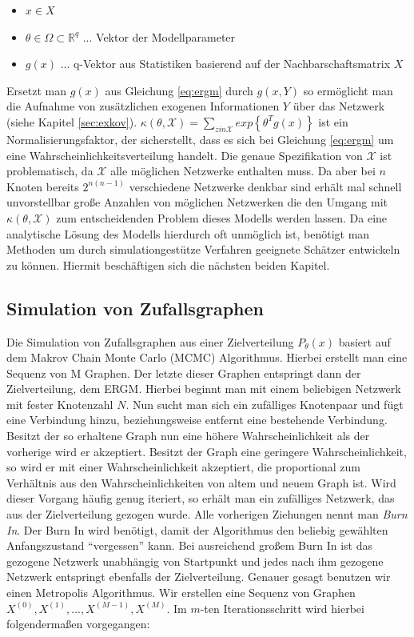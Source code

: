 \documentclass[a4paper,ngerman,oneside,titlepage,bibliography=totoc,11pt]{scrreprt}
\begin{document}
\begin{itemize}
	\item $x \in X$
	\item $\theta \in \Omega \subset \mathbb{R}^q$ ... Vektor der Modellparameter
	\item $g(x)$ ... q-Vektor aus Statistiken basierend auf der Nachbarschaftsmatrix $X$
\end{itemize}
Ersetzt man $g(x)$ aus Gleichung \ref{eq:ergm} durch $g(x,Y)$ so ermöglicht man die Aufnahme von zusätzlichen exogenen Informationen $Y$ über das Netzwerk (siehe Kapitel \ref{sec:exkov}). $\kappa(\theta, \mathcal{X}) = \sum_{z in \mathcal{X}}{exp\left\{\theta^T g(x)\right\}}$ ist ein Normalisierungsfaktor, der sicherstellt, dass es sich bei Gleichung \ref{eq:ergm} um eine Wahrscheinlichkeitsverteilung handelt. Die genaue Spezifikation von $\mathcal{X}$ ist problematisch, da $\mathcal{X}$ alle möglichen Netzwerke enthalten muss. Da aber bei $n$ Knoten bereits $2^{n(n-1)}$ verschiedene Netzwerke denkbar sind erhält mal schnell unvorstellbar große Anzahlen von möglichen Netzwerken die den Umgang mit  $\kappa(\theta, \mathcal{X})$ zum entscheidenden Problem dieses Modells werden lassen. Da eine analytische Lösung des Modells hierdurch oft unmöglich ist, benötigt man Methoden um durch simulationgestütze Verfahren geeignete Schätzer entwickeln zu können. Hiermit beschäftigen sich die nächsten beiden Kapitel.

\subsection{Simulation von Zufallsgraphen}
\label{sec:simzuf}
Die Simulation von Zufallsgraphen aus einer Zielverteilung $P_\theta(x)$ basiert auf dem Makrov Chain Monte Carlo (MCMC) Algorithmus. Hierbei erstellt man eine Sequenz von M Graphen. Der letzte dieser Graphen entspringt dann der Zielverteilung, dem ERGM. Hierbei beginnt man mit einem beliebigen Netzwerk mit fester Knotenzahl $N$. Nun sucht man sich ein zufälliges Knotenpaar und fügt eine Verbindung hinzu, beziehungsweise entfernt eine bestehende Verbindung. Besitzt der so erhaltene Graph nun eine höhere Wahrscheinlichkeit als der vorherige wird er akzeptiert. Besitzt der Graph eine geringere Wahrscheinlichkeit, so wird er mit einer Wahrscheinlichkeit akzeptiert, die proportional zum Verhältnis aus den Wahrscheinlichkeiten von altem und neuem Graph ist. Wird dieser Vorgang häufig genug iteriert, so erhält man ein zufälliges Netzwerk, das aus der Zielverteilung gezogen wurde. Alle vorherigen Ziehungen nennt man \emph{Burn In}. Der Burn In wird benötigt, damit der Algorithmus den beliebig gewählten Anfangszustand "`vergessen"' kann. Bei ausreichend großem Burn In ist das gezogene Netzwerk unabhängig von Startpunkt und jedes nach ihm gezogene Netzwerk entspringt ebenfalls der Zielverteilung.
Genauer gesagt benutzen wir einen Metropolis Algorithmus. Wir erstellen eine Sequenz von Graphen $X^{(0)}, X^{(1)}, ..., X^{(M-1)}, X^{(M)}$. Im $m$-ten Iterationsschritt wird hierbei folgendermaßen vorgegangen:
\end{document}

